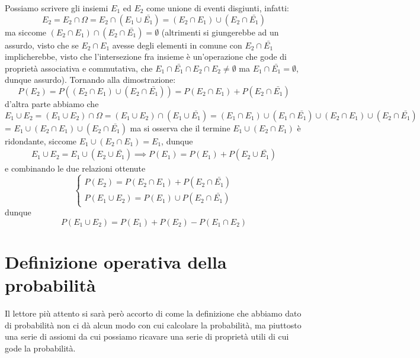 \documentclass{report}
\begin{document}
	\begin{myproof}
		Possiamo scrivere gli insiemi $E_1$ ed $E_2$ come unione di eventi disgiunti, infatti:
		$$
			E_2 = E_2 \cap \Omega = E_2 \cap (E_1 \cup \bar{E_1}) = (E_2 \cap E_1) \cup (E_2 \cap \bar{E_1})
		$$
		ma siccome $(E_2 \cap E_1) \cap (E_2 \cap \bar{E_1}) = \emptyset$ (altrimenti si giungerebbe ad un assurdo, visto che se $E_2 \cap E_1$ avesse degli elementi in comune con $E_2 \cap \bar{E_1}$ implicherebbe, visto che l'intersezione fra insieme è un'operazione che gode di proprietà associativa e commutativa, che $E_1 \cap \bar{E_1} \cap E_2 \cap E_2 \neq \emptyset$ ma $E_1 \cap \bar{E_1} = \emptyset$, dunque assurdo). Tornando alla dimostrazione:
		\begin{equation}
			P(E_2) = P \left( (E_2 \cap E_1) \cup (E_2 \cap \bar{E_1}) \right) = P(E_2 \cap E_1) + P(E_2 \cap \bar{E_1})
		\end{equation}
		d'altra parte abbiamo che
		$$
			E_1 \cup E_2 = (E_1 \cup E_2) \cap \Omega = (E_1 \cup E_2) \cap (E_1 \cup \bar{E_1}) = (E_1 \cap E_1) \cup (E_1 \cap \bar{E_1}) \cup (E_2 \cap E_1) \cup (E_2 \cap \bar{E_1})
		$$ = $E_1 \cup (E_2 \cap E_1) \cup (E_2 \cap \bar{E_1})$
		ma si osserva che il termine $E_1 \cup (E_2 \cap E_1)$ è ridondante, siccome $E_1 \cup (E_2 \cap E_1) = E_1$, dunque
		\begin{align*}
			E_1 \cup E_2 = E_1 \cup (E_2 \cup \bar{E_1}) \implies P(E_1) = P(E_1) + P(E_2 \cup \bar{E_1})
		\end{align*}
		e combinando le due relazioni ottenute
		\begin{equation*}			
			\begin{cases}
				P(E_2) = P(E_2 \cap E_1) + P(E_2 \cap \bar{E_1}) \\
				P(E_1 \cup E_2) = P(E_1) \cup P(E_2 \cap \bar{E_1})
			\end{cases}
		\end{equation*}
		dunque
		$$
			P(E_1 \cup E_2) = P(E_1) + P(E_2) - P(E_1 \cap E_2)
		$$
	\end{myproof}
	\section{Definizione operativa della probabilità}
	Il lettore più attento si sarà però accorto di come la definizione che abbiamo dato di probabilità non ci dà alcun modo con cui calcolare la probabilità, ma piuttosto una serie di assiomi da cui possiamo ricavare una serie di proprietà utili di cui gode la probabilità.
\end{document}
